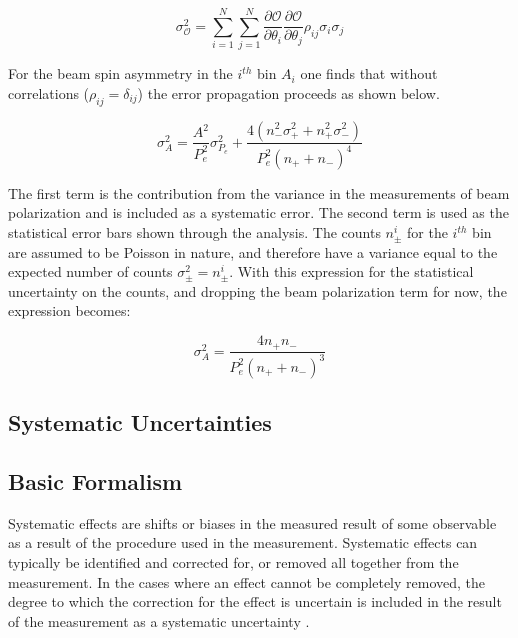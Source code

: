 \begin{equation}
  \label{eqn:error-propagation}
  \sigma_{\mathcal{O}}^2 = \sum_{i=1}^{N} \sum_{j=1}^{N} \frac{\partial \mathcal{O}}{\partial \theta_i} \frac{\partial \mathcal{O}}{\partial \theta_j} \rho_{ij} \sigma_i \sigma_j 
\end{equation}
  
For the beam spin asymmetry in the $i^{th}$ bin $A_i$ one finds that without correlations ($\rho_{ij} = \delta_{ij}$) the error propagation proceeds as shown below.

\begin{equation}
  \sigma_{A}^{2} = \frac{A^2}{P_{e}^2} \sigma_{P_{e}}^{2} + \frac{4 (n_{-}^{2} \sigma_{+}^{2}  + n_{+}^{2} \sigma_{-}^{2})}{ P_{e}^{2} (n_{+} + n_{-})^4}
\end{equation} 

The first term is the contribution from the variance in the measurements of beam polarization and is included as a systematic error.  The second term is used as the statistical error bars shown through the analysis.  The counts $n_{\pm}^{i}$ for the $i^{th}$ bin are assumed to be Poisson in nature, and therefore have a variance equal to the expected number of counts $\sigma_{\pm}^{2} = n_{\pm}^{i}$.  With this expression for the statistical uncertainty on the counts, and dropping the beam polarization term for now, the expression becomes: 

\begin{equation}
  \sigma_{A}^{2} = \frac{4n_+ n_-}{P_{e}^{2} (n_+ + n_-)^3}
\end{equation}

\subsection{Systematic Uncertainties}


\subsection{Basic Formalism}

Systematic effects are shifts or biases in the measured result of some observable as a result of the procedure used in the measurement.  Systematic effects can typically be identified and corrected for, or removed all together from the measurement.  In the cases where an effect cannot be completely removed, the degree to which the correction for the effect is uncertain is included in the result of the measurement as a systematic uncertainty \cite{misc-barlow:2002}. \\


